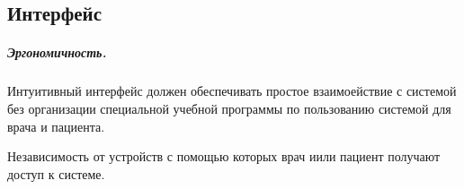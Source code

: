 \subsection{Интерфейс}
\subparagraph{Эргономичность.}

Интуитивный интерфейс должен обеспечивать простое взаимоействие с системой без
организации специальной учебной программы по пользованию системой для врача и
пациента. 

Независимость от устройств с помощью которых врач иили пациент получают
доступ к системе.
